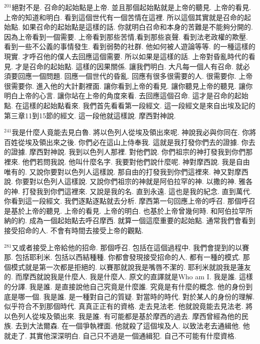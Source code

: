 \documentclass{book}
\begin{document}
$^{201}$絕對不是.
召命的起始點是上帝.
並且那個起始點就是上帝的聽見.
上帝的看見.
上帝的知道和明白.
看到這個世代有一個苦情在這裡.
所以這個其實就是召命的起始點.
如果召命的起始點是這樣的話.
你就明白召命和本身的苦難是不能夠分開的.
因為上帝看到一個需要.
上帝看到那些苦情,看到那些哀聲.
看到法老政權的欺壓.
看到一些不公義的事情發生.
看到弱勢的社群.
他如何被人遊論等等.
的一種這樣的現實.
才呼召他的僕人去回應這個需要.
所以如果是這樣的話.
上帝對昏亂時代的看見.
才是召命的起始點.
這樣的因果關係.
讓我們明白.
大凡每一個人有召命.
就必須要回應一個問題.
回應一個世代的昏亂.
回應有很多很需要的人.
很需要你.
上帝很需要你.
進入他的大計劃裡面.
讓你看到上帝的看見.
讓你聽見上帝的聽見.
讓你明白上帝的心言.
讓你站在上帝的角度來看.
去回應這個召命.
這才是召命的起始點.
在這樣的起始點看來.
我們首先看看第一段經文.
這一段經文是來自出埃及記的第三章11到15節的經文.
這一段他就這樣說.
摩西對神說.

$^{241}$我是什麼人竟能去見白魯.
將以色列人從埃及領出來呢.
神說我必與你同在.
你將百姓從埃及領出來之後.
你們必在這山上侍奉我.
這就是我打發你們去的證據.
你去的證據.
摩西對神說.
我到以色列人那裡.
對他們說.
你們祖宗的神打發我到你們那裡來.
他們若問我說.
他叫什麼名字.
我要對他們說什麼呢.
神對摩西說.
我是自由唯有的.
又說你要對以色列人這樣說.
那自由的打發我到你們這裡來.
神又對摩西說.
你要對以色列人這樣說.
又說你們祖宗的神就是阿伯拉罕的神.
以撒的神.
雅各的神.
打發我到你們這裡來.
又說是我的名.
直到永遠.
這也是我的紀念.
直到萬代.
你看到這一段經文.
我們逐點逐點就去分析.
摩西第一句回應上帝的呼召.
那個呼召是基於上帝的聽見.
上帝的看見.
上帝的明白.
也基於上帝曾幾何時.
和阿伯拉罕所納的約.
成為一個起始點去呼召摩西.
就算一個這麼重要的起始點.
通常我們會看到接受招命的人.
不會有時間去接受上帝的觀點.

$^{281}$又或者接受上帝給他的招命.
那個呼召.
包括在這個過程中.
我們會提到的以賽那.
包括耶利米.
包括以西結種種.
你都會發現接受招命的人.
都有一種的模式.
那個模式就是第一次都是拒絕的.
以賽那就說我是嘴唇不潔的.
耶利米就說我是蓮友的.
而摩西就說我是什麼人.
我是什麼人.
原文的直譯就是Who am I.
我是誰.
這樣的分譯.
我是誰.
是直接說他自己究竟是什麼誰.
究竟是有什麼的概念.
他的身份到底是哪一個.
我是誰.
是一種對自己的質疑.
對當時的時代.
對於某人的身份的理解.
似乎符合不到那個時代.
真真正正有的資格.
走去見法老.
他就說竟能去見法老.
將以色列人從埃及領出來.
我是誰.
有可能都是基於摩西的過去.
摩西曾經為他的民族.
去到大法爾森.
在一個爭執裡面.
他就殺了這個埃及人.
以致法老去通緝他.
他就走了.
其實他深深明白.
自己只不過是一個通緝犯.
自己不可能有什麼資格.
\end{document}
